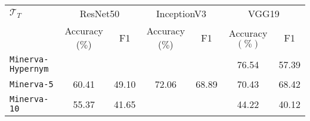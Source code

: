 \begin{tabular}{l|cc|cc|cc} \hline
	$\mathcal{T}_T$ &  \multicolumn{2}{c}{ResNet50} & \multicolumn{2}{|c|}{InceptionV3} & \multicolumn{2}{c}{VGG19}\\
			& Accuracy ($\%$) & F1 & Accuracy ($\%$) & F1 & Accuracy $(\%)$ & F1 \\\hline \hline
	\texttt{Minerva-Hypernym} & \cellcolor{yellow!25}{76.64} & \cellcolor{yellow!25}{58.56} & \cellcolor{green!25}{79.40} & \cellcolor{green!25}{60.07} & 76.54 & 57.39 \\
	\texttt{Minerva-5} & 60.41  & 49.10 & 72.06 & 68.89 & 70.43 & 68.42\\
	\texttt{Minerva-10} & 55.37 & 41.65  & \cellcolor{green!25}{60.1} & \cellcolor{green!25}{45.12} & 44.22 & 40.12 \\
\hline
\end{tabular}
